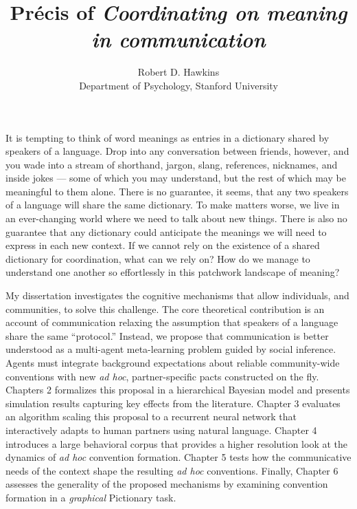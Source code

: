 \documentclass[11pt]{article}
\title{Pr\'ecis of \emph{Coordinating on meaning in communication} }
\author{Robert D. Hawkins \\ \small Department of Psychology, Stanford University}
\date{}
\begin{document}

\maketitle

It is tempting to think of word meanings as entries in a dictionary shared by speakers of a language. 
Drop into any conversation between friends, however, and you wade into a stream of shorthand, jargon, slang, references, nicknames, and inside jokes --- some of which you may understand, but the rest of which may be meaningful to them alone. 
There is no guarantee, it seems, that any two speakers of a language will share the same dictionary.
To make matters worse, we live in an ever-changing world where we need to talk about new things.
There is also no guarantee that any dictionary could anticipate the meanings we will need to express in each new context.
If we cannot rely on the existence of a shared dictionary for coordination, what can we rely on?
How do we manage to understand one another so effortlessly in this patchwork landscape of meaning?

My dissertation investigates the cognitive mechanisms that allow individuals, and communities, to solve this challenge.
The core theoretical contribution is an account of communication relaxing the assumption that speakers of a language share the same ``protocol.''
Instead, we propose that communication is better understood as a multi-agent meta-learning problem guided by social inference.
Agents must integrate background expectations about reliable community-wide conventions with new \emph{ad hoc}, partner-specific pacts constructed on the fly.
Chapters 2 formalizes this proposal in a hierarchical Bayesian model and presents simulation results capturing key effects from the literature. 
Chapter 3 evaluates an algorithm scaling this proposal to a recurrent neural network that interactively adapts to human partners using natural language.
Chapter 4 introduces a large behavioral corpus that provides a higher resolution look at the dynamics of \emph{ad hoc} convention formation. %
Chapter 5 tests how the communicative needs of the context shape the resulting \emph{ad hoc} conventions. 
Finally, Chapter 6 assesses the generality of the proposed mechanisms by examining convention formation in a \emph{graphical} Pictionary task. 
\end{document}
